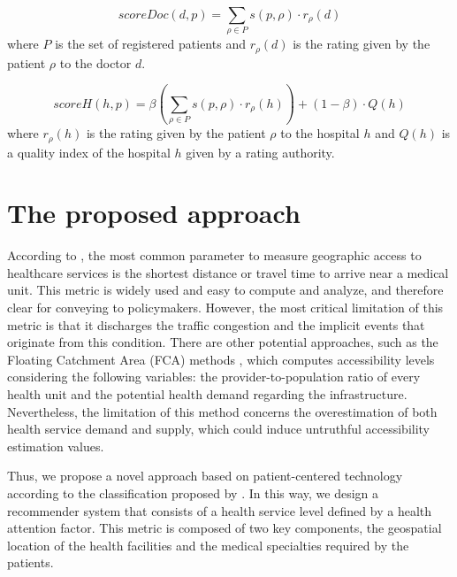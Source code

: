 \documentclass[sustainability,article,submit,pdftex,moreauthors]{Definitions/mdpi}
\begin{document}
\begin{equation}
	\label{eqn_scoreDoc}
	scoreDoc(d,p) = \sum_{\rho \in P}s(p,\rho)\cdot r_\rho (d)
\end{equation}
where $P$ is the set of registered patients and $r_\rho (d)$ is the rating given by the patient $\rho$ to the doctor $d$.

\begin{equation}
	\label{eqn:scoreH}
	scoreH(h,p) = \beta \left( \sum_{\rho \in P} s(p, \rho) \cdot r_\rho(h) \right) + (1-\beta) \cdot Q(h)
\end{equation}
where $r_\rho (h)$ is the rating given by the patient $\rho$ to the hospital $h$ and $Q(h)$ is a quality index of the hospital $h$ given by a rating authority.


\section{The proposed approach}

According to \citep{neutens2015accessibility}, the most common parameter to measure geographic access to healthcare services is the shortest distance or travel time to arrive near a medical unit. This metric is widely used and easy to compute and analyze, and therefore clear for conveying to policymakers. However, the most critical limitation of this metric is that it discharges the traffic congestion and the implicit events that originate from this condition. There are other potential approaches, such as the Floating Catchment Area (FCA) methods \citep{matthews2019using}, which computes accessibility levels considering the following variables: the provider-to-population ratio of every health unit and the potential health demand regarding the infrastructure. Nevertheless, the limitation of this method concerns the overestimation of both health service demand and supply, which could induce untruthful accessibility estimation values.

Thus, we propose a novel approach based on patient-centered technology according to the classification proposed by \citep{kraus2021digital}. In this way, we design a recommender system that consists of a health service level defined by a health attention factor. This metric is composed of two key components, the geospatial location of the health facilities and the medical specialties required by the patients. 
\end{document}
